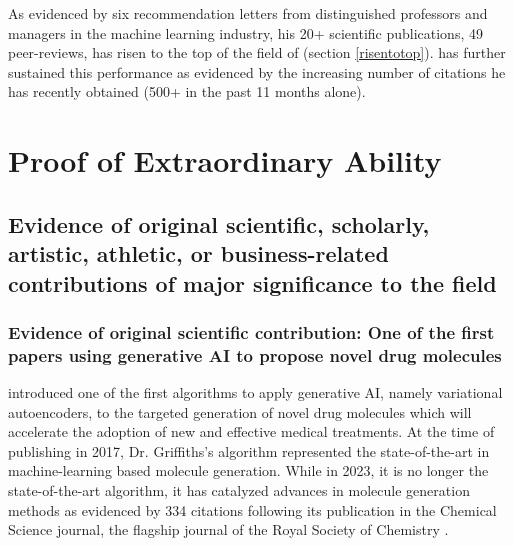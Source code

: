 \documentclass[11pt]{article}
\begin{document}
As evidenced by six recommendation letters from distinguished professors and managers in the machine learning industry, his 20+ scientific publications, 49 peer-reviews, \dr has risen to the top of the field of \fie{} (section \ref{risentotop}). \dr has further sustained this performance as evidenced by the increasing number of citations he has recently obtained (500+ in the past 11 months alone).


\section{Proof of \drs Extraordinary Ability}

\subsection{Evidence of original scientific, scholarly, artistic, athletic, or business-related contributions of major significance to the field}
\label{original}

\subsubsection{Evidence of original scientific contribution: One of the first papers using generative AI to propose novel drug molecules}
\label{conbo}

\dr introduced one of the first algorithms to apply generative AI, namely variational autoencoders, to the targeted generation of novel drug molecules which will accelerate the adoption of new and effective medical treatments. At the time of publishing in 2017, Dr. Griffiths’s algorithm represented the state-of-the-art in machine-learning based molecule generation. While in 2023, it is no longer the state-of-the-art algorithm, it has catalyzed advances in molecule generation methods as evidenced by 334 citations following its publication in the Chemical Science journal, the flagship journal of the Royal Society of Chemistry \cite{gscholar, conbo}. \\
\end{document}
